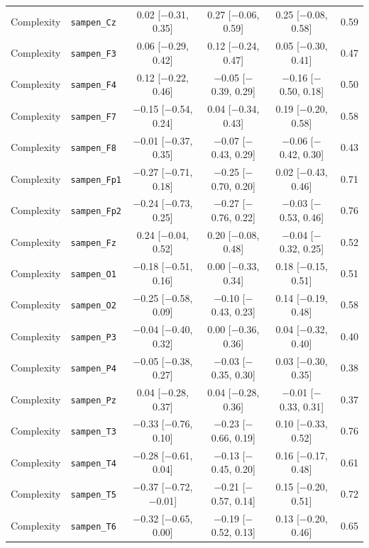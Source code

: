 {\begin{longtable}{llcccc}
Complexity & \texttt{sampen\_Cz} & 0.02 [$-$0.31, 0.35] & 0.27 [$-$0.06, 0.59] & 0.25 [$-$0.08, 0.58] & 0.59 \\
Complexity & \texttt{sampen\_F3} & 0.06 [$-$0.29, 0.42] & 0.12 [$-$0.24, 0.47] & 0.05 [$-$0.30, 0.41] & 0.47 \\
Complexity & \texttt{sampen\_F4} & 0.12 [$-$0.22, 0.46] & $-$0.05 [$-$0.39, 0.29] & $-$0.16 [$-$0.50, 0.18] & 0.50 \\
Complexity & \texttt{sampen\_F7} & $-$0.15 [$-$0.54, 0.24] & 0.04 [$-$0.34, 0.43] & 0.19 [$-$0.20, 0.58] & 0.58 \\
Complexity & \texttt{sampen\_F8} & $-$0.01 [$-$0.37, 0.35] & $-$0.07 [$-$0.43, 0.29] & $-$0.06 [$-$0.42, 0.30] & 0.43 \\
Complexity & \texttt{sampen\_Fp1} & $-$0.27 [$-$0.71, 0.18] & $-$0.25 [$-$0.70, 0.20] & 0.02 [$-$0.43, 0.46] & 0.71 \\
Complexity & \texttt{sampen\_Fp2} & $-$0.24 [$-$0.73, 0.25] & $-$0.27 [$-$0.76, 0.22] & $-$0.03 [$-$0.53, 0.46] & 0.76 \\
Complexity & \texttt{sampen\_Fz} & 0.24 [$-$0.04, 0.52] & 0.20 [$-$0.08, 0.48] & $-$0.04 [$-$0.32, 0.25] & 0.52 \\
Complexity & \texttt{sampen\_O1} & $-$0.18 [$-$0.51, 0.16] & 0.00 [$-$0.33, 0.34] & 0.18 [$-$0.15, 0.51] & 0.51 \\
Complexity & \texttt{sampen\_O2} & $-$0.25 [$-$0.58, 0.09] & $-$0.10 [$-$0.43, 0.23] & 0.14 [$-$0.19, 0.48] & 0.58 \\
Complexity & \texttt{sampen\_P3} & $-$0.04 [$-$0.40, 0.32] & 0.00 [$-$0.36, 0.36] & 0.04 [$-$0.32, 0.40] & 0.40 \\
Complexity & \texttt{sampen\_P4} & $-$0.05 [$-$0.38, 0.27] & $-$0.03 [$-$0.35, 0.30] & 0.03 [$-$0.30, 0.35] & 0.38 \\
Complexity & \texttt{sampen\_Pz} & 0.04 [$-$0.28, 0.37] & 0.04 [$-$0.28, 0.36] & $-$0.01 [$-$0.33, 0.31] & 0.37 \\
Complexity & \texttt{sampen\_T3} & $-$0.33 [$-$0.76, 0.10] & $-$0.23 [$-$0.66, 0.19] & 0.10 [$-$0.33, 0.52] & 0.76 \\
Complexity & \texttt{sampen\_T4} & $-$0.28 [$-$0.61, 0.04] & $-$0.13 [$-$0.45, 0.20] & 0.16 [$-$0.17, 0.48] & 0.61 \\
Complexity & \texttt{sampen\_T5} & $-$0.37 [$-$0.72, $-$0.01] & $-$0.21 [$-$0.57, 0.14] & 0.15 [$-$0.20, 0.51] & 0.72 \\
Complexity & \texttt{sampen\_T6} & $-$0.32 [$-$0.65, 0.00] & $-$0.19 [$-$0.52, 0.13] & 0.13 [$-$0.20, 0.46] & 0.65 \\

\end{longtable}}
